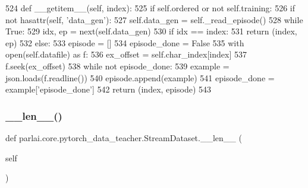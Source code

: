 \begin{DoxyCode}
524     \textcolor{keyword}{def }\_\_getitem\_\_(self, index):
525         \textcolor{keywordflow}{if} self.ordered \textcolor{keywordflow}{or} \textcolor{keywordflow}{not} self.training:
526             \textcolor{keywordflow}{if} \textcolor{keywordflow}{not} hasattr(self, \textcolor{stringliteral}{'data\_gen'}):
527                 self.data\_gen = self.\_read\_episode()
528             \textcolor{keywordflow}{while} \textcolor{keyword}{True}:
529                 idx, ep = next(self.data\_gen)
530                 \textcolor{keywordflow}{if} idx == index:
531                     \textcolor{keywordflow}{return} (index, ep)
532         \textcolor{keywordflow}{else}:
533             episode = []
534             episode\_done = \textcolor{keyword}{False}
535             with open(self.datafile) \textcolor{keyword}{as} f:
536                 ex\_offset = self.char\_index[index]
537                 f.seek(ex\_offset)
538                 \textcolor{keywordflow}{while} \textcolor{keywordflow}{not} episode\_done:
539                     example = json.loads(f.readline())
540                     episode.append(example)
541                     episode\_done = example[\textcolor{stringliteral}{'episode\_done'}]
542             \textcolor{keywordflow}{return} (index, episode)
543 
\end{DoxyCode}
\mbox{\label{classparlai_1_1core_1_1pytorch__data__teacher_1_1StreamDataset_abbd35926c8f0dd0dd153d5f838be163c}} 
\subsubsection{\texorpdfstring{\+\_\+\+\_\+len\+\_\+\+\_\+()}{\_\_len\_\_()}}
{\footnotesize\ttfamily def parlai.\+core.\+pytorch\+\_\+data\+\_\+teacher.\+Stream\+Dataset.\+\_\+\+\_\+len\+\_\+\+\_\+ (\begin{DoxyParamCaption}\item[{}]{self }\end{DoxyParamCaption})}



